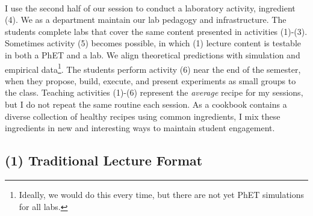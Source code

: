 \documentclass[../../../main.tex]{subfiles}
\begin{document}
\\
\vspace{0.25cm}
I use the second half of our session to conduct a laboratory activity, ingredient (4).  We as a department maintain our lab pedagogy and infrastructure.  The students complete labs that cover the same content presented in activities (1)-(3).  Sometimes activity (5) becomes possible, in which (1) lecture content is testable in both a PhET and a lab.  We align theoretical predictions with simulation and empirical data\footnote{Ideally, we would do this every time, but there are not yet PhET simulations for all labs.}.  The students perform activity (6) near the end of the semester, when they propose, build, execute, and present experiments as small groups to the class.  Teaching activities (1)-(6) represent the \textit{average} recipe for my sessions, but I do not repeat the same routine each session.  As a cookbook contains a diverse collection of healthy recipes using common ingredients, I mix these ingredients in new and interesting ways to maintain student engagement.

\subsection{(1) Traditional Lecture Format}
\end{document}

